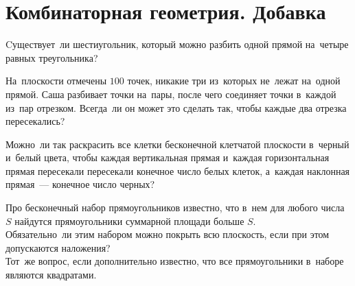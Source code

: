 
\section*{Комбинаторная геометрия. Добавка}


\begin{problems}

\item
Cуществует~ли шестиугольник, который можно разбить одной прямой на~четыре
равных треугольника?

\item
На~плоскости отмечены $100$ точек, никакие три из~которых не~лежат на~одной
прямой.
Саша разбивает точки на~пары, после чего соединяет точки в~каждой из~пар
отрезком.
Всегда~ли он может это сделать так, чтобы каждые два отрезка пересекались?

\item
Можно~ли так раскрасить все клетки бесконечной клетчатой плоскости в~черный
и~белый цвета, чтобы каждая вертикальная прямая и~каждая горизонтальная прямая
пересекали пересекали конечное число белых клеток, а~каждая наклонная
прямая~--- конечное число черных?

\item
Про бесконечный набор прямоугольников известно, что в~нем для любого числа~$S$
найдутся прямоугольники суммарной площади больше $S$.
\\
\subproblem
Обязательно~ли этим набором можно покрыть всю плоскость, если при этом
допускаются наложения?
\\
\subproblem
Тот~же вопрос, если дополнительно известно, что все прямоугольники в~наборе
являются квадратами.

\end{problems}

